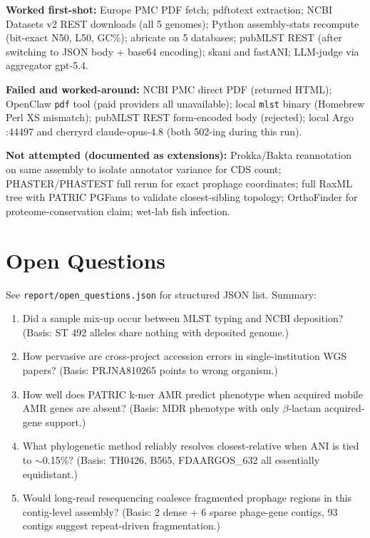 \documentclass[10pt]{article}
\begin{document}
\textbf{Worked first-shot:}
Europe PMC PDF fetch; pdftotext extraction; NCBI Datasets v2 REST downloads (all 5 genomes); Python assembly-stats recompute (bit-exact N50, L50, GC\%); abricate on 5 databases; pubMLST REST (after switching to JSON body + base64 encoding); skani and fastANI; LLM-judge via aggregator gpt-5.4.

\textbf{Failed and worked-around:}
NCBI PMC direct PDF (returned HTML); OpenClaw \texttt{pdf} tool (paid providers all unavailable); local \texttt{mlst} binary (Homebrew Perl XS mismatch); pubMLST REST form-encoded body (rejected); local Argo :44497 and cherryrd claude-opus-4.8 (both 502-ing during this run).

\textbf{Not attempted (documented as extensions):}
Prokka/Bakta reannotation on same assembly to isolate annotator variance for CDS count; PHASTER/PHASTEST full rerun for exact prophage coordinates; full RaxML tree with PATRIC PGFams to validate closest-sibling topology; OrthoFinder for proteome-conservation claim; wet-lab fish infection.

\section{Open Questions}
See \texttt{report/open\_questions.json} for structured JSON list. Summary:
\begin{enumerate}
\item Did a sample mix-up occur between MLST typing and NCBI deposition? (Basis: ST 492 alleles share nothing with deposited genome.)
\item How pervasive are cross-project accession errors in single-institution WGS papers? (Basis: PRJNA810265 points to wrong organism.)
\item How well does PATRIC k-mer AMR predict phenotype when acquired mobile AMR genes are absent? (Basis: MDR phenotype with only $\beta$-lactam acquired-gene support.)
\item What phylogenetic method reliably resolves closest-relative when ANI is tied to $\sim$0.15\%? (Basis: TH0426, B565, FDAARGOS\_632 all essentially equidistant.)
\item Would long-read resequencing coalesce fragmented prophage regions in this contig-level assembly? (Basis: 2 dense + 6 sparse phage-gene contigs, 93 contigs suggest repeat-driven fragmentation.)
\end{enumerate}
\end{document}

